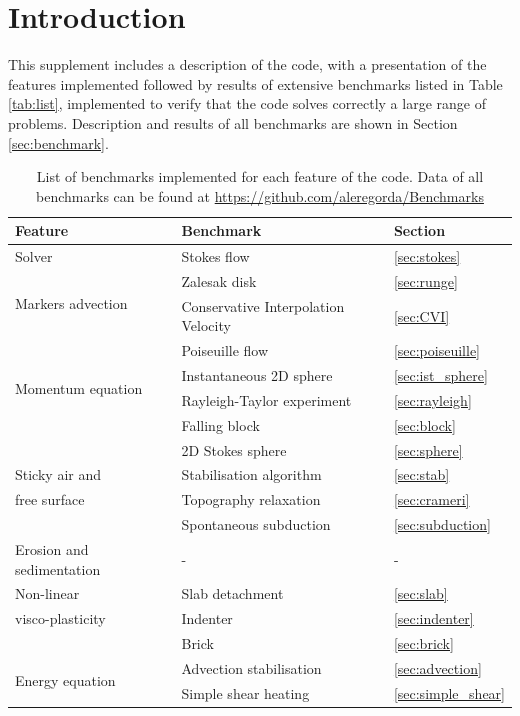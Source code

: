 \documentclass[hidelinks,10pt,a4paper]{article}
\begin{document}
\section{Introduction}\label{sec:intro}
This supplement includes a description of the code, with a presentation of the features implemented followed by results of extensive benchmarks listed in
Table \ref{tab:list}, implemented to verify that the code solves correctly a large range of problems. Description and results of all benchmarks are shown
in Section \ref{sec:benchmark}.

\begin{table}[H]
\caption{List of benchmarks implemented for each feature of the code. Data of all benchmarks can be found at 
\url{https://github.com/aleregorda/Benchmarks}}
\centering
\begin{tabular}{| l | l | l |}
\toprule
 \textbf{Feature}  & \textbf{Benchmark} & \textbf{Section} \\
\midrule
  Solver  & Stokes flow & \ref{sec:stokes} \\
\hline
  \multirow{2}{*}{Markers advection} & Zalesak disk & \ref{sec:runge} \\
    & Conservative Interpolation Velocity & \ref{sec:CVI} \\
\hline
  \multirow{4}{*}{Momentum equation}  & Poiseuille flow & \ref{sec:poiseuille}\\
    & Instantaneous 2D sphere & \ref{sec:ist_sphere} \\
    & Rayleigh-Taylor experiment & \ref{sec:rayleigh} \\
    & Falling block & \ref{sec:block} \\
\hline
    & 2D Stokes sphere & \ref{sec:sphere} \\
    Sticky air and  & Stabilisation algorithm & \ref{sec:stab} \\
    free surface & Topography relaxation & \ref{sec:crameri} \\
  & Spontaneous subduction & \ref{sec:subduction} \\
\hline
  Erosion and sedimentation  & - & - \\
\hline
   Non-linear  & Slab detachment & \ref{sec:slab} \\
   visco-plasticity & Indenter & \ref{sec:indenter} \\
    & Brick & \ref{sec:brick} \\
\hline
  \multirow{3}{*}{Energy equation}  & Advection stabilisation & \ref{sec:advection} \\
    & Simple shear heating & \ref{sec:simple_shear} \\

\end{tabular}
\end{table}
\end{document}
